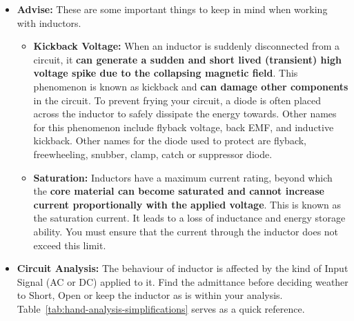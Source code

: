 \begin{itemize}
\begin{itemize}
        to high-frequency signals while passing low-frequency or DC current
        with little attenuation — essentially an inductor used specifically
        for its blocking behaviour rather than for energy storage or
        filtering math.
        Example: a ferrite bead or RF choke in series with a supply line to
        block noise from a switching regulator.
      \item \textbf{Transformers}: Two or more windings magnetically
        coupled through a shared core, used to transfer energy between
        circuits without a direct electrical connection. Important in power
        applications (stepping voltage up or down) and signal applications
        (galvanic isolation, impedance matching).
        Example: a mains transformer stepping 230V down to 12V, or a
        pulse transformer isolating a gate-drive signal.
    \end{itemize}
  \item \textbf{Advise:} These are some important things to keep in mind when
    working with inductors.
    \begin{itemize}
      \item \textbf{Kickback Voltage:} When an inductor is suddenly
        disconnected from a circuit, it \textbf{can generate a sudden and
        short lived (transient) high voltage spike due to the collapsing
        magnetic field}. This phenomenon is known as kickback and
        \textbf{can damage other components} in the circuit. To prevent
        frying your circuit, a diode is often placed across the inductor
        to safely dissipate the energy towards. Other names for this
        phenomenon include flyback voltage, back EMF, and inductive
        kickback. Other names for the diode used to protect are
        flyback, freewheeling, snubber, clamp, catch or suppressor diode.
      \item \textbf{Saturation:} Inductors have a maximum current rating,
        beyond which the \textbf{core material can become saturated and cannot
        increase current proportionally with the applied voltage}. This
        is known as the saturation current. It leads to a loss of inductance
        and energy storage ability. You must ensure that the current through
        the inductor does not exceed this limit.
    \end{itemize}
  \item \textbf{Circuit Analysis:}
    The behaviour of inductor is affected by the kind of Input Signal (AC
    or DC) applied to it. Find the admittance before deciding weather to
    Short, Open or keep the inductor as is within your analysis. Table~\ref{tab:hand-analysis-simplifications}
    serves as a quick reference.
\end{itemize}

